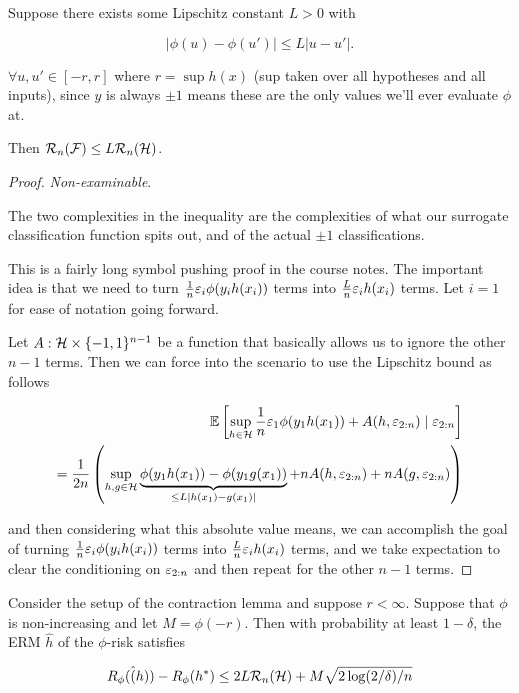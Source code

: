 \documentclass[11pt]{scrartcl}
\begin{document}
\begin{lemma}
Suppose there exists some Lipschitz constant $L>0$ with

\begin{equation}
    |\phi(u) - \phi(u')| \le L|u-u'|.
\end{equation}

$\forall u, u' \in [-r,r]$ where $r = \sup h(x)$ (sup taken over all hypotheses and all inputs), since $y$ is always $\pm 1$ means these are the only values we'll ever evaluate $\phi$ at.

Then $\mathcal{R}_n (\mathcal{F}) \le L \mathcal{R}_n(\mathcal{H})$.

\begin{proof}
\textit{Non-examinable}.

The two complexities in the inequality are the complexities of what our surrogate classification function spits out, and of the actual $\pm 1$ classifications.

This is a fairly long symbol pushing proof in the course notes. The important idea is that we need to turn $\frac1n \varepsilon_i \phi(y_i h(x_i))$ terms into $\frac{L}{n}\varepsilon_i h(x_i)$ terms. Let $i=1$ for ease of notation going forward.

Let $A : \mathcal{H} \times \{ -1, 1\}^{n-1}$ be a function that basically allows us to ignore the other $n-1$ terms. Then we can force into the scenario to use the Lipschitz bound as follows

\begin{align}
    \mathbb{E} \left[ \sup_{h \in \mathcal{H}} \frac1n \varepsilon_1 \phi(y_1h(x_1)) + A(h, \varepsilon_{2:n}) \mid \varepsilon_{2:n} \right] \\
    = \frac{1}{2n} \left( \sup_{h, g \in \mathcal{H}}{ \underbrace{\phi(y_1h(x_1)) - \phi(y_1g(x_1))}_{\le L |h(x_1) - g(x_1)|} + nA(h,\varepsilon_{2:n}) + nA(g,\varepsilon_{2:n})} \right)
\end{align}

and then considering what this absolute value means, we can accomplish the goal of turning $\frac1n \varepsilon_i \phi(y_i h(x_i))$ terms into $\frac{L}{n}\varepsilon_i h(x_i)$ terms, and we take expectation to clear the conditioning on $\varepsilon_{2:n}$ and then repeat for the other $n-1$ terms.


\end{proof}
\end{lemma}

\begin{corollary}
\label{classic bound with phi}
Consider the setup of the contraction lemma and suppose $r < \infty$. Suppose that $\phi$ is non-increasing and let $M = \phi(-r)$. Then with probability at least $1 - \delta$, the ERM $\hat{h}$ of the $\phi$-risk satisfies 

\begin{equation}
\label{phi risk bound apapt}
    R_\phi(\hat(h)) - R_\phi(h^*) \le 2 L \mathcal{R}_n(\mathcal{H}) + M \sqrt{ 2 \log (2/\delta) / n }
\end{equation}
\end{corollary}
\end{document}
